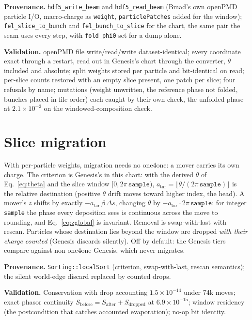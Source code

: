 \documentclass[11pt]{article}
\newcommand{\code}[1]{\texttt{#1}}
\newenvironment{provenance}{\par\small\textbf{Provenance.}}{\par}
\newenvironment{validation}{\par\small\textbf{Validation.}}{\par}
\begin{document}
\begin{provenance}
\code{hdf5\_write\_beam} and \code{hdf5\_read\_beam} (Bmad's own openPMD particle I/O,
macro-charge as \code{weight}, \code{particlePatches} added for the window);
\code{fel\_slice\_to\_bunch} and \code{fel\_bunch\_to\_slice} for the chart, the same
pair the seam uses every step, with \code{fold\_phi0} set for a dump alone.
\end{provenance}
\begin{validation}
openPMD file write/read/write dataset-identical; every coordinate exact through a
restart, read out in Genesis's chart through the converter, $\theta$ included and
absolute; split weights stored per particle and bit-identical on read; per-slice counts
restored with an empty slice present, one patch per slice; four refusals by name;
mutations (weight unwritten, the reference phase not folded, bunches placed in file
order) each caught by their own check, the unfolded phase at $2.1\times10^{-2}$ on the
windowed-composition check.
\end{validation}

\section{Slice migration}\label{sec:migration}

With per-particle weights, migration needs no one4one: a mover carries its own charge.
The criterion is Genesis's in this chart: with the derived $\theta$ of
Eq.~\ref{eq:theta} and the slice window $[0, 2\pi\,\code{sample})$,
$a_{\mathrm{tar}} = \lfloor\theta/(2\pi\,\code{sample})\rfloor$ is the relative
destination (positive $\theta$ drift moves toward higher index, the head). A mover's
$z$ shifts by exactly $-a_{\mathrm{tar}}\,\beta\,\Delta s$, changing $\theta$ by
$-a_{\mathrm{tar}}\cdot2\pi\,\code{sample}$: for integer \code{sample} the phase every
deposition sees is continuous across the move to rounding, and
Eq.~\ref{eq:zglobal} is invariant. Removal is swap-with-last with rescan. Particles
whose destination lies beyond the window are dropped \emph{with their charge counted}
(Genesis discards silently). Off by default: the Genesis tiers compare against
non-one4one Genesis, which never migrates.

\begin{provenance}
\code{Sorting::localSort} (criterion, swap-with-last, rescan semantics); the silent
world-edge discard replaced by counted drops.
\end{provenance}
\begin{validation}
Conservation with drop accounting $1.5\times10^{-14}$ under 74k moves; exact phasor
continuity $S_{\mathrm{before}} = S_{\mathrm{after}} + S_{\mathrm{dropped}}$ at
$6.9\times10^{-15}$; window residency (the postcondition that catches accounted
evaporation); no-op bit identity.
\end{validation}
\end{document}
